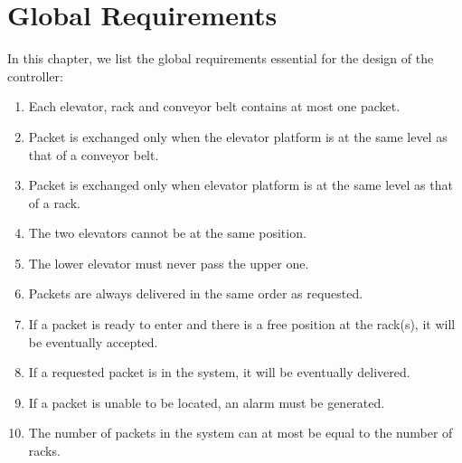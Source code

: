 \section*{Global Requirements}
\label{sec:global_req}
In this chapter, we list the global requirements essential for the design of the controller:
\begin{enumerate}
\item Each elevator, rack and conveyor belt contains at most one packet.
\item Packet is exchanged only when the elevator platform is at the same level as that of a conveyor belt.
\item Packet is exchanged only when elevator platform is at the same level as that of a rack.
\item The two elevators cannot be at the same position.
\item The lower elevator must never pass the upper one.
\item Packets are always delivered in the same order as requested.
\item If a packet is ready to enter and there is a free position at the rack(s), it will be eventually accepted.
\item If a requested packet is in the system, it will be eventually delivered. %
\item If a packet is unable to be located, an alarm must be generated.
\item The number of packets in the system can at most be equal to the number of racks.
 



\end{enumerate}